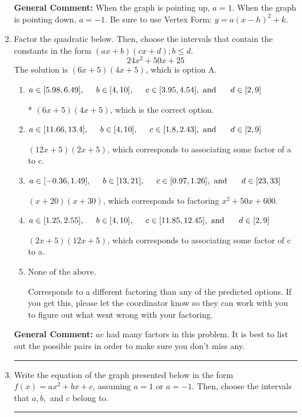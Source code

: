 \documentclass{extbook}[14pt]
\newcommand{\litem}[1]{\item #1

\rule{\textwidth}{0.4pt}}
\begin{document}
\begin{enumerate}
{\textbf{General Comment:} When the graph is pointing up, $a=1$. When the graph is pointing down, $a=-1$. Be sure to use Vertex Form: $y = a(x-h)^2+k$.
}
\litem{
Factor the quadratic below. Then, choose the intervals that contain the constants in the form $(ax+b)(cx+d); b \leq d.$
\[ 24x^{2} +50 x + 25 \]The solution is \( (6x + 5)(4x + 5) \), which is option A.\begin{enumerate}[label=\Alph*.]
\item \( a \in [5.98, 6.49], \hspace*{5mm} b \in [4, 10], \hspace*{5mm} c \in [3.95, 4.54], \text{ and } \hspace*{5mm} d \in [2, 9] \)

* $(6x + 5)(4x + 5)$, which is the correct option.
\item \( a \in [11.66, 13.4], \hspace*{5mm} b \in [4, 10], \hspace*{5mm} c \in [1.8, 2.43], \text{ and } \hspace*{5mm} d \in [2, 9] \)

 $(12x + 5)(2x + 5)$, which corresponds to associating some factor of a to c.
\item \( a \in [-0.36, 1.49], \hspace*{5mm} b \in [13, 21], \hspace*{5mm} c \in [0.97, 1.26], \text{ and } \hspace*{5mm} d \in [23, 33] \)

 $(x + 20)(x + 30)$, which corresponds to factoring $x^{2} +50 x + 600$.
\item \( a \in [1.25, 2.55], \hspace*{5mm} b \in [4, 10], \hspace*{5mm} c \in [11.85, 12.45], \text{ and } \hspace*{5mm} d \in [2, 9] \)

 $(2x + 5)(12x + 5)$, which corresponds to associating some factor of c to a.
\item \( \text{None of the above.} \)

 Corresponds to a different factoring than any of the predicted options. If you get this, please let the coordinator know so they can work with you to figure out what went wrong with your factoring.
\end{enumerate}

\textbf{General Comment:} $ac$ had many factors in this problem. It is best to list out the possible pairs in order to make sure you don't miss any.
}
\litem{
Write the equation of the graph presented below in the form $f(x)=ax^2+bx+c$, assuming  $a=1$ or $a=-1$. Then, choose the intervals that $a, b,$ and $c$ belong to.

}
\end{enumerate}
\end{document}
